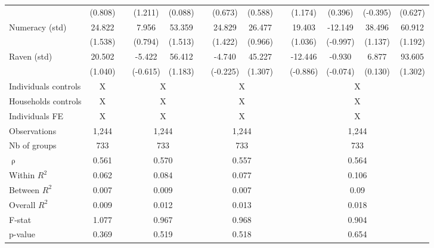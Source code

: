 \begin{table}[htbp]
{\begin{tabular}{lcccccccccccc}
      & (0.808) &   & (1.211) & (0.088) &   & (0.673) & (0.588) &   & (1.174) & (0.396) & (-0.395) & (0.627) \\
    Numeracy (std) & 24.822 &   & 7.956 & 53.359 &   & 24.829 & 26.477 &   & 19.403 & -12.149 & 38.496 & 60.912 \\
      & (1.538) &   & (0.794) & (1.513) &   & (1.422) & (0.966) &   & (1.036) & (-0.997) & (1.137) & (1.192) \\
    Raven (std) & 20.502 &   & -5.422 & 56.412 &   & -4.740 & 45.227 &   & -12.446 & -0.930 & 6.877 & 93.605 \\
      & (1.040) &   & (-0.615) & (1.183) &   & (-0.225) & (1.307) &   & (-0.886) & (-0.074) & (0.130) & (1.302) \\
\cmidrule{1-2}\cmidrule{4-5}\cmidrule{7-8}\cmidrule{10-13}
    Individuals controls & X     &       & \multicolumn{2}{c}{X} &       & \multicolumn{2}{c}{X} &       & \multicolumn{4}{c}{X} \\
    Households controls & X     &       & \multicolumn{2}{c}{X} &       & \multicolumn{2}{c}{X} &       & \multicolumn{4}{c}{X} \\
    Individuals FE & X     &       & \multicolumn{2}{c}{X} &       & \multicolumn{2}{c}{X} &       & \multicolumn{4}{c}{X} \\
    \midrule
    Observations & 1,244  &       & \multicolumn{2}{c}{1,244} &       & \multicolumn{2}{c}{1,244} &       & \multicolumn{4}{c}{1,244} \\
    Nb of groups & 733   &       & \multicolumn{2}{c}{733} &       & \multicolumn{2}{c}{733} &       & \multicolumn{4}{c}{733} \\
    $\uprho$ & 0.561 &       & \multicolumn{2}{c}{0.570} &       & \multicolumn{2}{c}{0.557} &       & \multicolumn{4}{c}{0.564} \\
    Within $R^2$ & 0.062 &       & \multicolumn{2}{c}{0.084} &       & \multicolumn{2}{c}{0.077} &       & \multicolumn{4}{c}{0.106} \\
    Between $R^2$ & 0.007 &       & \multicolumn{2}{c}{0.009} &       & \multicolumn{2}{c}{0.007} &       & \multicolumn{4}{c}{0.09} \\
    Overall $R^2$ & 0.009 &       & \multicolumn{2}{c}{0.012} &       & \multicolumn{2}{c}{0.013} &       & \multicolumn{4}{c}{0.018} \\
    F-stat & 1.077 &       & \multicolumn{2}{c}{0.967} &       & \multicolumn{2}{c}{0.968} &       & \multicolumn{4}{c}{0.904} \\
    p-value & 0.369 &       & \multicolumn{2}{c}{0.519} &       & \multicolumn{2}{c}{0.518} &       & \multicolumn{4}{c}{0.654} \\

\end{tabular}}
\end{table}

